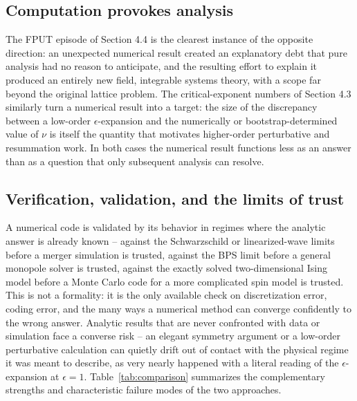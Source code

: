 \documentclass[11pt]{article}
\begin{document}
\subsection{Computation provokes analysis}

The FPUT episode of Section 4.4 is the clearest instance of the opposite direction: an unexpected numerical result created an explanatory debt that pure analysis had no reason to anticipate, and the resulting effort to explain it produced an entirely new field, integrable systems theory, with a scope far beyond the original lattice problem. The critical-exponent numbers of Section 4.3 similarly turn a numerical result into a target: the size of the discrepancy between a low-order $\epsilon$-expansion and the numerically or bootstrap-determined value of $\nu$ is itself the quantity that motivates higher-order perturbative and resummation work. In both cases the numerical result functions less as an answer than as a question that only subsequent analysis can resolve.

\subsection{Verification, validation, and the limits of trust}

A numerical code is validated by its behavior in regimes where the analytic answer is already known -- against the Schwarzschild or linearized-wave limits before a merger simulation is trusted, against the BPS limit before a general monopole solver is trusted, against the exactly solved two-dimensional Ising model before a Monte Carlo code for a more complicated spin model is trusted. This is not a formality: it is the only available check on discretization error, coding error, and the many ways a numerical method can converge confidently to the wrong answer. Analytic results that are never confronted with data or simulation face a converse risk -- an elegant symmetry argument or a low-order perturbative calculation can quietly drift out of contact with the physical regime it was meant to describe, as very nearly happened with a literal reading of the $\epsilon$-expansion at $\epsilon=1$. Table~\ref{tab:comparison} summarizes the complementary strengths and characteristic failure modes of the two approaches.
\end{document}
